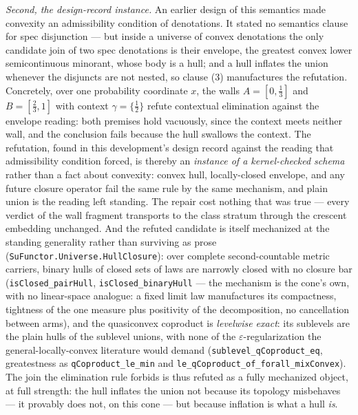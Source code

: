 \emph{Second, the design-record instance.} An earlier design of
this semantics made convexity an admissibility condition of
denotations. It stated no semantics clause for spec disjunction
--- but inside a universe of convex denotations the only candidate
join of two spec denotations is their envelope, the greatest
convex lower semicontinuous minorant, whose body is a hull; and a
hull inflates the union whenever the disjuncts are not nested, so
clause (3) manufactures the refutation. Concretely, over one
probability coordinate $x$, the walls $A = [0, \tfrac13]$ and
$B = [\tfrac23, 1]$ with context $\gamma = \{\tfrac12\}$ refute
contextual elimination against the envelope reading: both premises
hold vacuously, since the context meets neither wall, and the
conclusion fails because the hull swallows the context. The
refutation, found in this development's design record against the
reading that admissibility condition forced, is thereby an
\emph{instance of a kernel-checked schema} rather than a fact
about convexity: convex hull, locally-closed envelope, and any
future closure operator fail the same rule by the same mechanism,
and plain union is the reading left standing. The repair cost
nothing that was true --- every verdict of the wall fragment
transports to the class stratum through the crescent embedding
unchanged. And the refuted candidate is itself mechanized at the
standing generality rather than surviving as prose
(\texttt{SuFunctor.Universe.HullClosure}): over complete
second-countable metric carriers, binary hulls of closed sets of
laws are narrowly closed with no closure bar
(\texttt{isClosed\_pairHull}, \texttt{isClosed\_binaryHull} ---
the mechanism is the cone's own, with no linear-space analogue: a
fixed limit law manufactures its compactness, tightness of the one
measure plus positivity of the decomposition, no cancellation
between arms), and the quasiconvex coproduct is \emph{levelwise
exact}: its sublevels are the plain hulls of the sublevel
unions, with none of the $\varepsilon$-regularization the
general-locally-convex literature would demand
(\texttt{sublevel\_qCoproduct\_eq}, greatestness as
\texttt{qCoproduct\_le\_min} and
\texttt{le\_qCoproduct\_of\_forall\_mixConvex}). The join the
elimination rule forbids is thus refuted as a fully mechanized
object, at full strength: the hull inflates the union not because
its topology misbehaves --- it provably does not, on this cone ---
but because inflation is what a hull \emph{is}.

